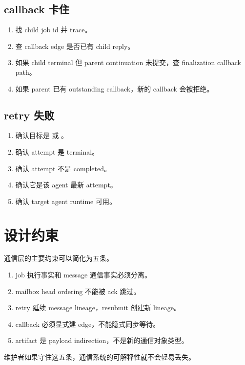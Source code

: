 \subsection{callback 卡住}

\begin{enumerate}
  \item 找 child job id 并 trace。
  \item 查 callback edge 是否已有 child reply。
  \item 如果 child terminal 但 parent continuation 未提交，查 finalization callback path。
  \item 如果 parent 已有 outstanding callback，新的 callback 会被拒绝。
\end{enumerate}

\subsection{retry 失败}

\begin{enumerate}
  \item 确认目标是  或 。
  \item 确认 attempt 是 terminal。
  \item 确认 attempt 不是 completed。
  \item 确认它是该 agent 最新 attempt。
  \item 确认 target agent runtime 可用。
\end{enumerate}

\section{设计约束}

通信层的主要约束可以简化为五条。

\begin{enumerate}
  \item job 执行事实和 message 通信事实必须分离。
  \item mailbox head ordering 不能被 ack 跳过。
  \item retry 延续 message lineage，resubmit 创建新 lineage。
  \item callback 必须显式建 edge，不能隐式同步等待。
  \item artifact 是 payload indirection，不是新的通信对象类型。
\end{enumerate}

维护者如果守住这五条，通信系统的可解释性就不会轻易丢失。
